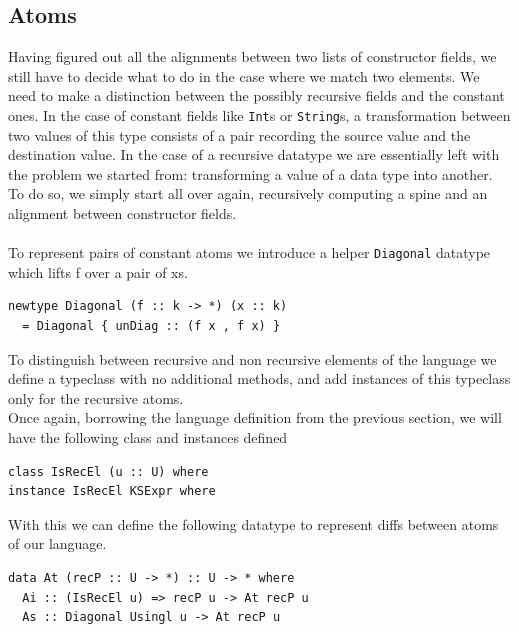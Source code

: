 \documentclass[11pt, titlepage]{article}
\begin{document}
\subsection{Atoms}\label{atoms}

Having figured out all the alignments between two lists of constructor
fields, we still have to decide what to do in the case where we match two
elements. We need to make a distinction between the possibly
recursive fields and the constant ones.
In the case of constant fields
like \texttt{Int}s or \texttt{String}s, a transformation between two
values of this type consists of a pair recording the source value and the
destination value. In the case of a recursive datatype we are
essentially left with the problem we started from: transforming a value
of a data type into another. To do so, we simply start all over again,
recursively computing a spine and an alignment between constructor
fields.
\\\\
To represent pairs of constant atoms we introduce a helper \texttt{Diagonal} datatype which 
lifts f over a pair of xs.

\begin{verbatim}
newtype Diagonal (f :: k -> *) (x :: k) 
  = Diagonal { unDiag :: (f x , f x) }
\end{verbatim}

To distinguish between recursive and non recursive elements of the language we 
define a typeclass with no additional methods, and add instances of this typeclass only for the recursive atoms.
\\
Once again, borrowing the language definition from the previous section, we will have the following 
class and instances defined
\begin{verbatim}
class IsRecEl (u :: U) where
instance IsRecEl KSExpr where
\end{verbatim}

With this we can define the following datatype to represent diffs between atoms of our language.
\begin{verbatim}
data At (recP :: U -> *) :: U -> * where
  Ai :: (IsRecEl u) => recP u -> At recP u
  As :: Diagonal Usingl u -> At recP u
\end{verbatim}
\end{document}
